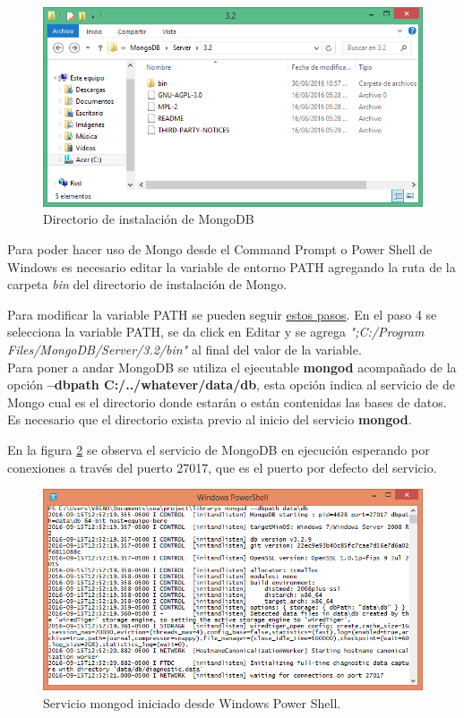 \documentclass[10pt,a4paper]{report}
\begin{document}
\begin{figure}[H]
	\centering
	\includegraphics[scale=0.65]{images/mongo-installation-directory}
	\caption{Directorio de instalación de MongoDB}\label{fig:mongo-directory}
\end{figure}

Para poder hacer uso de Mongo desde el Command Prompt o Power Shell de Windows es necesario editar la variable de entorno PATH agregando la ruta de la carpeta \textit{bin} del directorio de instalación de Mongo.

Para modificar la variable PATH se pueden seguir \href{https://support.microsoft.com/en-us/kb/310519}{estos pasos}. En el paso 4 se selecciona la variable PATH, se da click en Editar y se agrega \textit{";C:/Program Files/MongoDB/Server/3.2/bin"} al final del valor de la variable.\\

Para poner a andar MongoDB se utiliza el ejecutable \textbf{mongod} acompañado de la opción \textbf{--dbpath  C:/../whatever/data/db}, esta opción indica al servicio de de Mongo cual es el directorio donde estarán o están contenidas las bases de datos. Es necesario que el directorio exista previo al inicio del servicio \textbf{mongod}.

En la figura \ref{fig:mongod-service} se observa el servicio de MongoDB en ejecución esperando por conexiones a través del puerto 27017, que es el puerto por defecto del servicio.\\

\begin{figure}[H]
	\centering
	\includegraphics[scale=0.65]{images/mongo-service-started}
	\caption{Servicio mongod iniciado desde Windows Power Shell.}\label{fig:mongod-service}
\end{figure}
\end{document}
